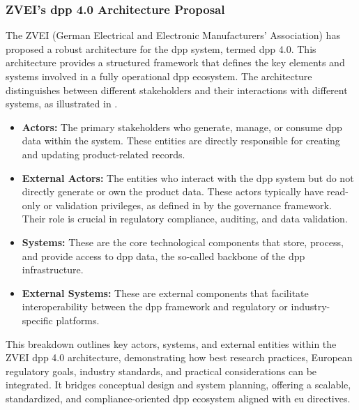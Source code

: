 \subsubsection*{ZVEI's \ac{dpp} 4.0 Architecture Proposal}
The ZVEI (German Electrical and Electronic Manufacturers' Association) has proposed a robust architecture for the \acrlong{dpp} system, termed \ac{dpp} 4.0. This architecture provides a structured framework that defines the key elements and systems involved in a fully operational \ac{dpp} ecosystem. The architecture distinguishes between different stakeholders and their interactions with different systems, as illustrated in . \autocite{Garrels.2023}

\begin{itemize}[itemsep=0.5\baselineskip]
    \item \textbf{Actors:} The primary stakeholders who generate, manage, or consume \ac{dpp} data within the system. These entities are directly responsible for creating and updating product-related records.
    
    \item \textbf{External Actors:} The entities who interact with the \ac{dpp} system but do not directly generate or own the product data. These actors typically have read-only or validation privileges, as defined in by the governance framework. Their role is crucial in regulatory compliance, auditing, and data validation.
    
    \item \textbf{Systems:} These are the core technological components that store, process, and provide access to \ac{dpp} data, the so-called backbone of the \ac{dpp} infrastructure.
    
    \item \textbf{External Systems:} These are external components that facilitate interoperability between the \ac{dpp} framework and regulatory or industry-specific platforms.
\end{itemize}

This breakdown outlines key actors, systems, and external entities within the ZVEI \ac{dpp} 4.0 architecture, demonstrating how best research practices, European regulatory goals, industry standards, and practical considerations can be integrated. It bridges conceptual design and system planning, offering a scalable, standardized, and compliance-oriented \ac{dpp} ecosystem aligned with \ac{eu} directives. \autocite{Garrels.2023}

